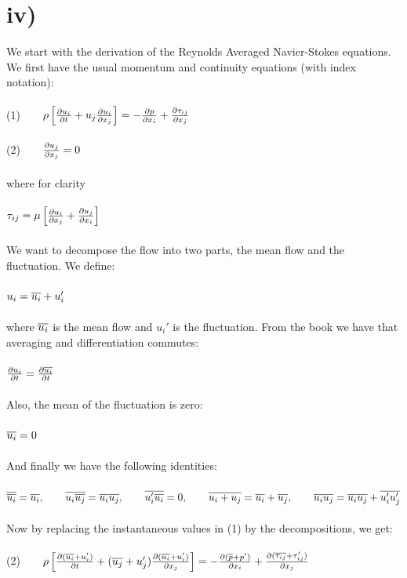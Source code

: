 \documentclass[a4paper,english,11pt,twoside]{article}
\newcommand{\tab}{\hspace*{2em}}
\begin{document}
\newpage
\section*{iv)}
We start with the derivation of the Reynolds Averaged Navier-Stokes equations. We first have the usual momentum and continuity equations (with index notation):\\
\\
(1)$\tab \rho\left[\pdi{u_i}{t} + u_j\pdi{u_i}{x_j}\right] = -\pdi{p}{x_i} + \pdi{\tau_{ij}}{x_j}$\\
\\
(2)$\tab\pdi{u_j}{x_j} = 0$\\
\\
where for clarity\\ 
\\
$\tau_{ij} = \mu\left[\frac{\partial u_i}{\partial x_j} + \frac{\partial u_j}{\partial x_i} \right]$\\
\\
We want to decompose the flow into two parts, the mean flow and the fluctuation. We define:\\
\\
$u_i = \overline{u_i} + u_i'$\\
\\
where $\overline{u_i}$ is the mean flow and $u_i'$ is the fluctuation. From the book we have that averaging and differentiation commutes:\\
\\
$\frac{\partial u_i}{\partial t} = \frac{\partial \overline{u_i}}{\partial t}$\\
\\
Also, the mean of the fluctuation is zero:\\
\\
$\overline{u_i} = 0$\\
\\
And finally we have the following identities:\\
\\
$\ol{\ol{u_i}} = \ol{u_i},\tab\ol{u_i\ol{u_j}} = \ol{u_i}\ol{u_j},\tab\ol{u_i'\ol{u_i}} = 0,\tab\ol{u_i + u_j} = \ol{u_i} + \ol{u_j},\tab\ol{u_i u_j} = \ol{u_i}\ol{u_j} + \ol{u_i' u_j'}$\\
\\
Now by replacing the instantaneous values in (1) by the decompositions, we get:\\
\\
(2)$\tab \rho\left[\pdi{(\ol{u_i} + u_i')}{t} + (\ol{u_j} + u_j')\pdi{(\ol{u_i} + u_i')}{x_j}\right] = -\pdi{(\ol{p} + p')}{x_i} + \pdi{(\ol{\tau_{ij}} + \tau_{ij}')}{x_j}$\\
\end{document}
